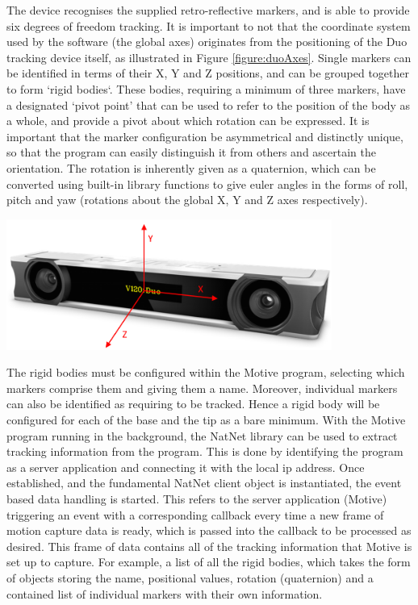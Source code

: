 \documentclass[11pt]{article}
\begin{document}
The device recognises the supplied retro-reflective markers, and is able to provide six degrees of freedom tracking. It is important to not that the coordinate system used by the software (the global axes) originates from the positioning of the Duo tracking device itself, as illustrated in Figure \ref{figure:duoAxes}. Single markers can be identified in terms of their X, Y and Z positions, and can be grouped together to form `rigid bodies`. These bodies, requiring a minimum of three markers, have a designated `pivot point' that can be used to refer to the position of the body as a whole, and provide a pivot about which rotation can be expressed. It is important that the marker configuration be asymmetrical and distinctly unique, so that the program can easily distinguish it from others and ascertain the orientation. The rotation is inherently given as a quaternion, which can be converted using built-in library functions to give euler angles in the forms of roll, pitch and yaw (rotations about the global X, Y and Z axes respectively).


\begin{center}
\includegraphics[width=0.8\textwidth]{images/duoAxes.png}
\label{figure:duoAxes}
\end{center}

The rigid bodies must be configured within the Motive program, selecting which markers comprise them and giving them a name. Moreover, individual markers can also be identified as requiring to be tracked. Hence a rigid body will be configured for each of the base and the tip as a bare minimum. With the Motive program running in the background, the NatNet library can be used to extract tracking information from the program. This is done by identifying the program as a server application and connecting it with the local ip address. Once established, and the fundamental NatNet client object is instantiated, the event based data handling is started. This refers to the server application (Motive) triggering an event with a corresponding callback every time a new frame of motion capture data is ready, which is passed into the callback to be processed as desired. This frame of data contains all of the tracking information that Motive is set up to capture. For example, a list of all the rigid bodies, which takes the form of objects storing the name, positional values, rotation (quaternion) and a contained list of individual markers with their own information.
\end{document}
